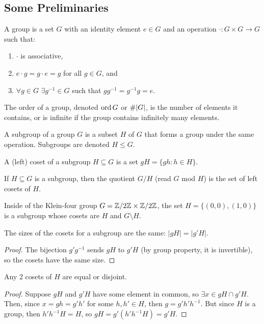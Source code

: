 \subsection{Some Preliminaries}
\begin{defn}
A group is a set $G$ with an identity element $e\in G$ and an operation $\cdot: G\times G\to G$ such that:
\begin{enumerate}
\item $\cdot$ is associative,
\item $e\cdot g = g\cdot e = g$ for all $g\in G$, and
\item $\forall g\in G$ $\exists g^{-1}\in G$ such that $gg^{-1} = g^{-1}g = e$.
\end{enumerate}
\end{defn}
\begin{defn}
The order of a group, denoted $\operatorname{ord} G$ or $\#|G|$, is the number of elements it contains, or is infinite if the group contains infinitely many elements.
\end{defn}
\begin{defn}
A subgroup of a group $G$ is a subset $H$ of $G$ that forms a group under the same operation. Subgroups are denoted $H\le G$.
\end{defn}
\begin{defn}
A (left) coset of a subgroup $H\subseteq G$ is a set $gH = \{gh: h\in H\}$.
\end{defn}
\begin{defn}
If $H\subseteq G$ is a subgroup, then the quotient $G/H$ (read $G$ mod $H$) is the set of left cosets of $H$.
\end{defn}
Inside of the Klein-four group $G = \mathbb{Z}/2\mathbb{Z} \times \mathbb{Z}/2\mathbb{Z}$, the set $H = \{(0,0),(1,0)\}$ is a subgroup whose cosets are $H$ and $G\setminus H$.
\begin{lem}
The sizes of the cosets for a subgroup are the same: $|gH| = |g'H|$.
\end{lem}
\begin{proof}
The bijection $g'g^{-1}$ sends $gH$ to $g'H$ (by group property, it is invertible), so the cosets have the same size.
\end{proof}
\begin{lem}
Any 2 cosets of $H$ are equal or disjoint.
\end{lem}
\begin{proof}
Suppose $gH$ and $g'H$ have some element in common, so $\exists x\in gH\cap g'H$. Then, since $x = gh = g'h'$ for some $h,h'\in H$, then $g = g'h'h^{-1}$. But since $H$ is a group, then $h'h^{-1} H = H$, so $gH = g'(h'h^{-1} H) = g'H$.
\end{proof}
